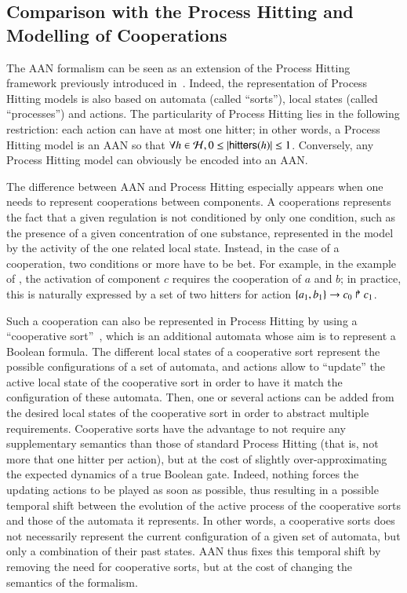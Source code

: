 \subsection{Comparison with the Process Hitting and Modelling of Cooperations}
\label{ssec:cooperation}

The AAN formalism can be seen as an extension of the Process Hitting framework
previously introduced in~\cite{PMR10-TCSB}.
Indeed, the representation of Process Hitting models is also based on automata
(called “sorts”), local states (called “processes”) and actions.
The particularity of Process Hitting lies in the following restriction:
each action can have at most one hitter;
in other words, a Process Hitting model is an AAN so that
$\forall h \in \mathcal{H}, 0 \leq |\mathsf{hitters}(h)| \leq 1$.
Conversely, any Process Hitting model can obviously be encoded into an AAN.

The difference between AAN and Process Hitting especially appears when one
needs to represent cooperations between components.
A cooperations represents the fact that
a given regulation is not conditioned by only one condition,
such as the presence of a given concentration of one substance,
represented in the model by the activity of the one related local state.
Instead, in the case of a cooperation, two conditions or more have to be bet.
For example, in the example of ,
the activation of component $c$ requires the cooperation of $a$ and $b$;
in practice, this is naturally expressed by a set of two hitters for action
$\{a_1, b_1\}\rightarrow c_0\Rsh c_1$.

Such a cooperation can also be represented in Process Hitting
by using a “cooperative sort”~\cite{PMR10-TCSB},
which is an additional automata
whose aim is to represent a Boolean formula.
The different local states of a cooperative sort represent the possible configurations
of a set of automata,
and actions allow to “update” the active local state of the cooperative sort
in order to have it match the configuration of these automata.
Then, one or several actions can be added from the desired local states of the cooperative sort
in order to abstract multiple requirements.
Cooperative sorts have the advantage to not require any supplementary semantics
than those of standard Process Hitting
(that is, not more that one hitter per action),
but at the cost of slightly over-approximating the expected dynamics of a true Boolean gate.
Indeed, nothing forces the updating actions to be played as soon as possible,
thus resulting in a possible temporal shift between the evolution
of the active process of the cooperative sorts and those of the automata it represents.
In other words, a cooperative sorts does not necessarily represent the current configuration
of a given set of automata, but only a combination of their past states.
AAN thus fixes this temporal shift by removing the need for cooperative sorts,
but at the cost of changing the semantics of the formalism.

